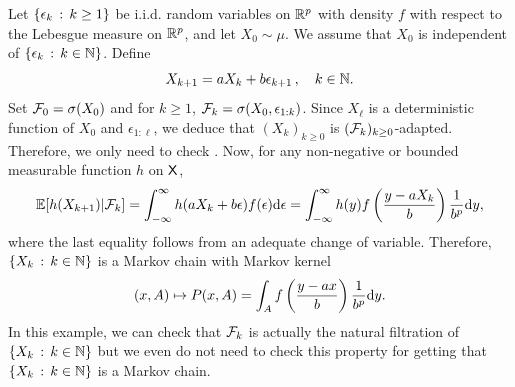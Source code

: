 \documentclass[english,graybox,envcountchap,envcountsame,sectrefs,shortlabels]{svmono}
\theoremstyle{style}
\newcommand{\blb}{\begin{leftbar}}
\newcommand{\elb}{\end{leftbar}}
\newcommand{\eqsp}{}
\begin{document}
\begin{example}
Let $\left\{ \epsilon_{k}\,:\,k\geq1\right\}$ be i.i.d. random variables on $\mathbb{R}^{p}$
with density $f$ with respect to the Lebesgue measure on $\mathbb{R}^{p}$,
and let $X_{0}\sim\mu$. We assume that $X_{0}$ is independent of
$\left\{ \epsilon_{k}\,:\,k\in\mathbb{N}\right\}$. Define
\[
X_{k+1}=aX_{k}+b\epsilon_{k+1}\,,\quad k\in\mathbb{N}.
\]
Set $\mathcal{F}_{0}=\sigma(X_{0})$ and for $k\geq1$, $\mathcal{F}_{k}=\sigma(X_{0},\epsilon_{1:k})$.
Since $X_{\ell}$ is a deterministic function of $X_{0}$ and $\epsilon_{1:\ell}$,
we deduce that $(X_{k})_{k\geq0}$ is $(\mathcal{F}_{k})_{k\geq0}$-adapted.
Therefore, we only need to check . Now, for any
non-negative or bounded measurable function $h$ on $\mathsf{X}$, 
\[
\PE[h(X_{k+1})|\mcf_{k}]=\int_{-\infty}^{\infty}h(aX_{k}+b\epsilon)f(\epsilon)\rmd\epsilon=\int_{-\infty}^{\infty}h(y)f\lr{\frac{y-aX_{k}}{b}}\frac{1}{b^{p}}\rmd y\eqsp,
\]
where the last equality follows from an adequate change of variable.
Therefore, $\left\{ X_{k}\,:\,k\in\mathbb{N}\right\}$ is a Markov chain with Markov
kernel
\[
(x,A)\mapsto P(x,A)=\int_{A}f\left(\frac{y-ax}{b}\right)\frac{1}{b^{p}}\mathrm{d} y.
\]
In this example, we can check that $\mathcal{F}_{k}$ is actually the natural
filtration of $\left\{ X_{k}\,:\,k\in\mathbb{N}\right\}$ but we even do not need to
check this property for getting that $\left\{ X_{k}\,:\,k\in\mathbb{N}\right\}$ is
a Markov chain.
\end{example}
\end{document}
